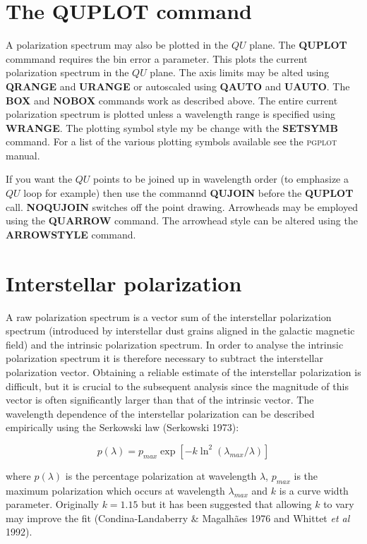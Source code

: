 \documentclass[11pt,nolof,noabs]{starlink}
\begin{document}
\section{The QUPLOT command}

A polarization spectrum may also be plotted in the $QU$ plane. The
\textbf{QUPLOT} commmand requires the bin error a parameter. This plots
the current polarization spectrum in the $QU$ plane. The axis limits
may be alted using \textbf{QRANGE} and \textbf{URANGE} or autoscaled using
\textbf{QAUTO} and \textbf{UAUTO}. The \textbf{BOX} and \textbf{NOBOX} commands
work as described above. The entire current polarization spectrum is
plotted unless a wavelength range is specified using \textbf{WRANGE}. The
plotting symbol style my be change with the \textbf{SETSYMB} command. For
a list of the various plotting symbols available see the \textsc{pgplot}
manual.

If you want the $QU$ points to be joined up in wavelength order (to
emphasize a $QU$ loop for example) then use the commannd \textbf{QUJOIN}
before the \textbf{QUPLOT} call. \textbf{NOQUJOIN} switches off the point
drawing. Arrowheads may be employed using the \textbf{QUARROW} command.
The arrowhead style can be altered using the \textbf{ARROWSTYLE} command.

\section{Interstellar polarization}

A raw polarization spectrum is a vector sum of the interstellar polarization
spectrum (introduced by interstellar dust grains aligned in the galactic
magnetic field) and the intrinsic polarization spectrum. In order to analyse
the intrinsic polarization spectrum it is therefore necessary to subtract the
interstellar polarization vector. Obtaining a reliable estimate of the
interstellar polarization is difficult, but it is crucial to the
subsequent analysis since the magnitude of this vector is often significantly
larger than that of the intrinsic vector. The wavelength dependence of the
interstellar polarization can be described empirically using the Serkowski law
(Serkowski 1973):

\begin{equation}
\label{serk}
p(\lambda)=p_{max} \exp [-k\ln^2 (\lambda_{max} / \lambda)]
\end{equation}

where $p(\lambda)$ is the percentage polarization at wavelength $\lambda$,
$p_{max}$ is the maximum polarization which occurs at wavelength
$\lambda_{max}$ and $k$ is a curve width parameter. Originally $k=1.15$ but it
has been suggested that allowing $k$ to vary may improve the fit
(Condina-Landaberry \& Magalh\~{a}es 1976 and Whittet \textit{et al} 1992).
\end{document}
